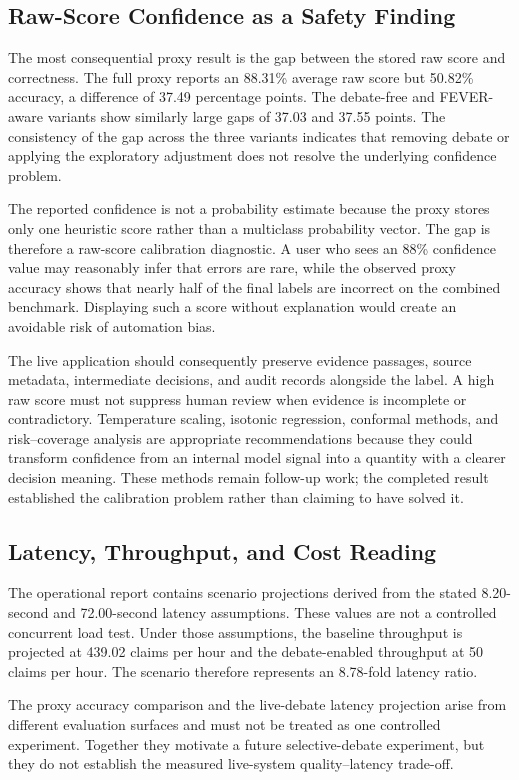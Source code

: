 \documentclass[12pt,a4paper,openany]{report}
\begin{document}
\subsection{Raw-Score Confidence as a Safety Finding}
The most consequential proxy result is the gap between the stored raw score
and correctness. The full proxy reports an 88.31\% average raw score
but 50.82\% accuracy, a difference of 37.49 percentage points. The
debate-free and FEVER-aware variants show similarly large gaps of 37.03 and
37.55 points. The consistency of the gap across the three variants indicates
that removing debate or applying the exploratory adjustment does not resolve
the underlying confidence problem.

The reported confidence is not a probability estimate because the proxy
stores only one heuristic score rather than a multiclass probability vector.
The gap is therefore a raw-score calibration diagnostic. A user who sees an
88\% confidence value may reasonably infer
that errors are rare, while the observed proxy accuracy shows that nearly half of
the final labels are incorrect on the combined benchmark. Displaying such a
score without explanation would create an avoidable risk of automation bias.

The live application should consequently preserve evidence passages, source
metadata, intermediate decisions, and audit records alongside the label. A
high raw score must not suppress human review when evidence is incomplete or
contradictory. Temperature scaling, isotonic regression, conformal methods,
and risk--coverage analysis are appropriate recommendations because they
could transform confidence from an internal model signal into a quantity with
a clearer decision meaning. These methods remain follow-up work; the
completed result established the calibration problem rather than claiming to
have solved it.

\subsection{Latency, Throughput, and Cost Reading}
The operational report contains scenario projections derived from the stated
8.20-second and 72.00-second latency assumptions. These values are not a
controlled concurrent load test. Under those assumptions, the baseline
throughput is projected at 439.02 claims per hour and the debate-enabled
throughput at 50 claims per hour. The scenario therefore represents an
8.78-fold latency ratio.

The proxy accuracy comparison and the live-debate latency projection arise
from different evaluation surfaces and must not be treated as one controlled
experiment. Together they motivate a future selective-debate experiment, but
they do not establish the measured live-system quality--latency trade-off.
\end{document}
